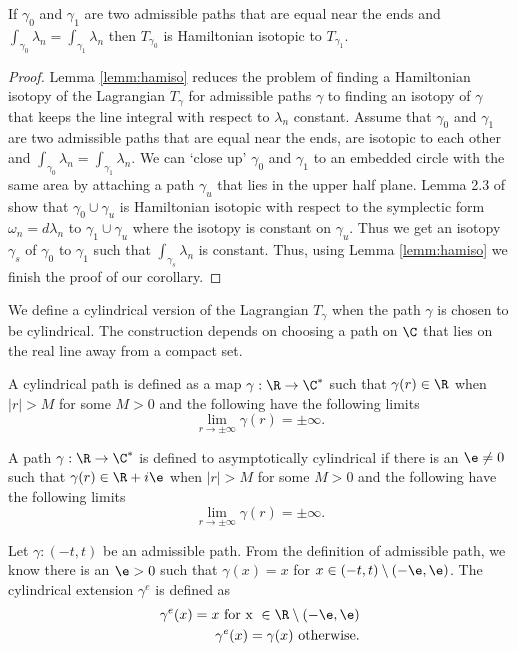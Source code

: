  \begin{cor}
 If  $\gamma_0$ and $\gamma_1$  are two admissible paths that are equal near the ends and $\int_{\gamma_0} \lambda_n = \int_{\gamma_1} \lambda_n $ then $T_{\gamma_0}$ is Hamiltonian isotopic to $T_{\gamma_1}$.
 \end{cor}
 \begin{proof}
 Lemma \ref{lemm:hamiso}  reduces the problem of finding a Hamiltonian isotopy of the Lagrangian $T_\gamma$ for admissible paths $\gamma$ to finding an isotopy of $\gamma$ that keeps the line integral with respect to $\lambda_n$ constant. Assume that $\gamma_0$ and $\gamma_1$ are two admissible paths that are equal near the ends, are isotopic to each other and $\int_{\gamma_0} \lambda_n = \int_{\gamma_1} \lambda_n $. We can `close up' $\gamma_0$ and $\gamma_1$ to an embedded circle with the same area by attaching a path  $\gamma_u$ that lies in the upper half plane. Lemma 2.3 of \cite{lekiliRational} show that $\gamma_0 \cup \gamma_u$ is Hamiltonian isotopic with respect to the symplectic form  $\omega_n=d\lambda_n$ to $\gamma_1 \cup \gamma_u$ where the isotopy is constant on $\gamma_u$. Thus we get an isotopy $\gamma_s$ of $\gamma_0$ to $\gamma_1$ such that  $\int_{\gamma_s}\lambda_n$ is constant. Thus, using Lemma \ref{lemm:hamiso} we finish the proof of our corollary.
 \end{proof}


\noindent We define a cylindrical version of the Lagrangian $T_\gamma$ when the path $\gamma$ is chosen to be cylindrical. The construction depends on choosing a path on $\C$ that lies on the real line away from a compact set.

\begin{defn}
 A cylindrical path is defined as a map $\gamma: \R \to \C^*$ such that  $\gamma(r) \in \R$  when $|r|>M$ for some $M>0$ and the following have the following limits 
 $$\lim_{r \to \pm \infty} \gamma(r) = \pm \infty.$$
 \end{defn}
 
 \begin{defn}
 A path $\gamma : \R \to \C^*$ is defined to asymptotically cylindrical if there is an $\e\neq 0$  such that  $\gamma(r) \in \R+i\e$  when $|r|>M$ for some $M>0$ and the following have the following limits 
 $$\lim_{r \to \pm \infty} \gamma(r) = \pm \infty.$$
 \end{defn}
 
 \begin{defn}
 Let $\gamma:(-t,t)$ be an admissible path. From the definition of admissible path, we know there is an $\e>0$ such that $\gamma(x)=x$ for $x\in(-t,t)\setminus (-\e,\e)$. The cylindrical extension $\gamma^e$ is defined as 
 \begin{align*}
     \gamma^e(x) = x \text{ for x } \in \R\setminus(-\e,\e) \\
     \gamma^e(x) = \gamma(x) \text{ otherwise.}
 \end{align*}
 \end{defn}

